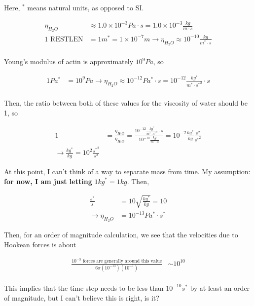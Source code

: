 \documentclass[12pt]{article}
\begin{document}
Here, $ {}^* $ means natural units, as opposed to SI. 

\begin{align}
    \eta_{H_{2}O} & \approx 1.0 \times 10^{-3} Pa \cdot s = 1.0 \times 10^{-3} \frac{kg}{m \cdot s} \\
    1 \text{ RESTLEN} & = 1 m^* = 1 \times 10^{-7} m \to \eta_{H_{2}O} \approx 10^{-10} \frac{kg}{m^*\cdot s}\\
\end{align}

Young's modulus of actin is approximately $ 10^9 Pa $, so

\begin{align}
    1 Pa^* & = 10^9 Pa \to \eta_{H_{2}O} \approx 10^{-12} Pa^* \cdot s = 10^{-12} \frac{kg^*}{m^* \cdot {s^*}^2} \cdot s\\
\end{align}

Then, the ratio between both of these values for the viscosity of water should be 1, so

\begin{align}
    1 & = \frac{\eta_{H_{2}O}}{\eta_{H_{2}O}} = \frac{10^{-12} \frac{kg^*}{m^* \cdot {s^*}^2} \cdot s}{10^{-10} \frac{kg}{m^*\cdot s}} = 10^{-2}
    \frac{kg^*}{kg} \frac{s^2}{{s^*}^2} \\
    \to \frac{kg^*}{kg} = 10^2 \frac{{s^*}^2}{s^2}
\end{align}

At this point, I can't think of a way to separate mass from time. My assumption: \textbf{for now, I am just letting} $ 1 kg^* = 1 kg $. Then,

\begin{align}
    \frac{s^*}s & = 10 \sqrt{\frac{kg^*}{kg}} = 10 \\
    \to \eta_{H_{2}O} &= 10^{-13} Pa^* \cdot s^*
\end{align}

Then, for an order of magnitude calculation, we see that the velocities due to Hookean forces is about

\begin{align}
    \frac{10^{-3} \text{ forces are generally around this value}}{6 \pi ( 10^{-13} ) ( 10^{-1} )} & \sim 10^{10} \\
\end{align}

This implies that the time step needs to be less than $ 10^{-10} s^* $ by at least an order of magnitude, but I can't believe this is right, is it?
\end{document}
